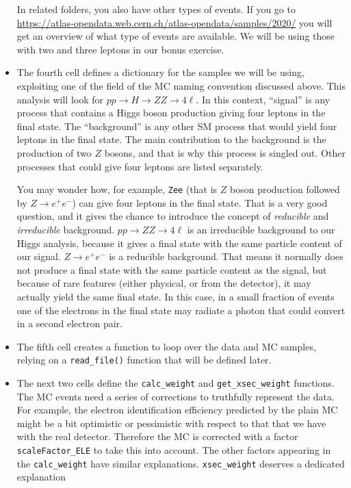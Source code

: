 \begin{itemize}
In related folders, you also have other types of events. If you go to \url{https://atlas-opendata.web.cern.ch/atlas-opendata/samples/2020/} you will get an overview of what type of events are available. We will be using those with two and three leptons in our bonus exercise. 

\item The fourth cell defines a dictionary for the samples we will be using, exploiting one of the field of the MC naming convention discussed above. This analysis will look for $pp\rightarrow H\rightarrow ZZ\rightarrow 4\ell$. In this context, ``signal'' is any process that contains a Higgs boson production giving four leptons in the final state. The ``background'' is any other SM process that would yield four leptons in the final state. The main contribution to the background is the production of two $Z$ bosons, and that is why this process is singled out. Other processes that could give four leptons are listed separately.

\begin{remark}
You may wonder how, for example, \verb|Zee| (that is $Z$ boson production followed by $Z\rightarrow e^+e^-$) can give four leptons in the final state. That is a very good question, and it gives the chance to introduce the concept of \textit{reducible} and \textit{irreducible} background. $pp\rightarrow ZZ \rightarrow 4 \ell$ is an irreducible background to our Higgs analysis, because it gives a final state with the same particle content of our signal. $Z\rightarrow e^+e^-$ is a reducible background. That means it normally does not produce a final state with the same particle content as the signal, but because of rare features (either physical, or from the detector), it may actually yield the same final state. In this case, in a small fraction of events one of the electrons in the final state may radiate a photon that could convert in a second electron pair. 
\end{remark}

\item The fifth cell creates a function to loop over the data and MC samples, relying on a \verb|read_file()| function that will be defined later. 
\item The next two cells define the \verb|calc_weight| and \verb|get_xsec_weight| functions. The MC events need a series of corrections to truthfully represent the data. For example, the electron identification efficiency predicted by the plain MC might be a bit optimistic or pessimistic with respect to that that we have with the real detector. Therefore the MC is corrected with a factor \verb|scaleFactor_ELE| to take this into account. The other factors appearing in the \verb|calc_weight| have similar explanations. \verb|xsec_weight| deserves a dedicated explanation 


\end{itemize}
